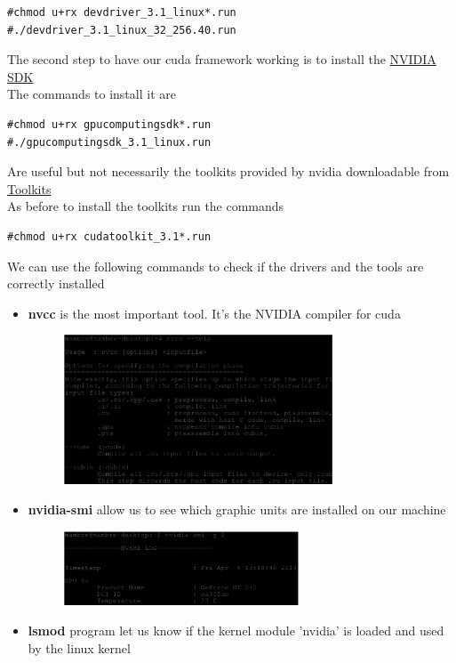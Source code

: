 \documentclass[a4paper,13pt]{article}
\begin{document}
\begin{multicols}{2}
\begin{lstlisting}
#chmod u+rx devdriver_3.1_linux*.run
#./devdriver_3.1_linux_32_256.40.run
\end{lstlisting}
    The second step to have our cuda framework working is to install the \href{https://mega.co.nz/#!d1FD0TiS!PusMUXIuLJzxiM_hh4ABi1ltWvAIARZutZR3wIR4TEU}{NVIDIA SDK}\\
    The commands to install it are
\begin{lstlisting}
#chmod u+rx gpucomputingsdk*.run
#./gpucomputingsdk_3.1_linux.run
\end{lstlisting}
    Are useful but not necessarily the toolkits provided by nvidia downloadable from \href{https://mega.co.nz/#!88kFCCJL!FmqUdQHY0VE00V5aQOcTQRuaufw9bZ6AS7ZyfQGXiSc} {Toolkits}\\
    As before to install the toolkits run the commands
\begin{lstlisting}
#chmod u+rx cudatoolkit_3.1*.run
\end{lstlisting}
    We can use the following commands to check if the drivers and the tools are correctly installed
    \begin{itemize}
        \item{{\bf nvcc} is the most important tool. It's the NVIDIA compiler for cuda}
            \begin{figure}[H]
                \includegraphics[width=8cm]{eps/nvcc.eps}
            \end{figure}
        \item{{\bf nvidia-smi} allow us to see which graphic units are installed on our machine}
            \begin{figure}[H]
                \includegraphics[width=7cm]{eps/nvidia-smi.eps}
            \end{figure}
        \item{{\bf lsmod} program let us know if the kernel module 'nvidia' is loaded and used by the linux kernel}

\end{itemize}
\end{multicols}
\end{document}
